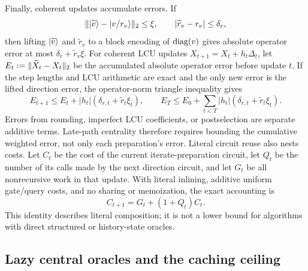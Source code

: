 Finally, coherent updates accumulate errors.  If
\begin{equation}
 \lVert\lvert \widetilde v\rangle-\lvert v/r_v\rangle\rVert_2\leq\xi,\qquad
 |\widetilde r_v-r_v|\leq\delta_r,                        \label{eq:prec-update-input-error}
\end{equation}
then lifting $\lvert \widetilde v\rangle$ and $\widetilde r_v$ to a block encoding
of $\operatorname{diag}(v)$ gives absolute operator error at most
$\delta_r+\widetilde r_v\xi$.  For coherent LCU updates
$X_{t+1}=X_t+h_t\Delta_t$, let
$E_t:=\lVert\widetilde X_t-X_t\rVert_2$ be the accumulated absolute operator error
before update $t$.  If the step lengths and LCU arithmetic are exact and the
only new error is the lifted direction error, the operator-norm triangle
inequality gives
\begin{equation}
 E_{t+1}\leq E_t+|h_t|
 (\delta_{r,t}+\widetilde r_t\xi_t),\qquad
 E_T\leq E_0+\sum_{t<T}|h_t|
 (\delta_{r,t}+\widetilde r_t\xi_t).                     \label{eq:prec-update-error-ledger}
\end{equation}
Errors from rounding, imperfect LCU coefficients, or postselection are
separate additive terms.  Late-path centrality therefore requires bounding
the cumulative weighted error, not only each preparation's error.
Literal circuit reuse also nests costs.  Let $C_t$
be the cost of the current iterate-preparation circuit, let $Q_t$ be the
number of its calls made by the next direction circuit, and let $G_t$ be all
nonrecursive work in that update.  With literal inlining, additive uniform
gate/query costs, and no sharing or memoization, the exact accounting is
\begin{equation}
 C_{t+1}=G_t+(1+Q_t)C_t.                                 \label{eq:prec-circuit-accounting}
\end{equation}
This identity describes literal composition; it is not a lower bound for
algorithms with direct structured or history-state oracles.

\subsection{Lazy central oracles and the caching ceiling}
\label{sec:preconditioning-lazy}

